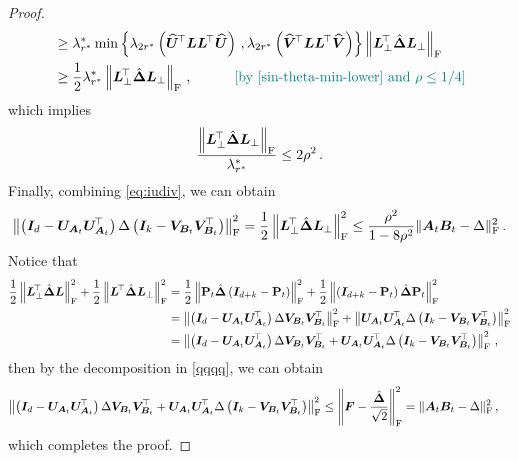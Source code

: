 \begin{proof}
\begin{align*}
    & \geq \lambda^*_{r^*} \min\left\{\lambda_{2r^*}\left(\widehat{\bm U}^{\!\top}\bm L \bm L^{\!\top} \widehat{\bm U}\right)\,,\lambda_{2r^*}\left(\widehat{\bm V}^{\!\top}\bm L \bm L^{\!\top} \widehat{\bm V}\right)\right\}\left\|\bm L_\perp^{\!\top}\hat{\bm \Delta}\bm L_\perp\right\|_{\rm F}\\
    & \geq \frac{1}{2}\lambda^*_{r^*} \left\|\bm L_\perp^{\!\top}\hat{\bm \Delta}\bm L_\perp\right\|_{\rm F}\,, \quad \tag*{\color{teal}[by \cref{sin-theta-min-lower} and $\rho \leq 1/4$]}
\end{align*}
which implies
\begin{align*}
    \frac{\left\|\bm L_\perp^{\!\top}\hat{\bm \Delta}\bm L_\perp\right\|_{\rm F}}{\lambda^*_{r^*}}\leq 2\rho^2\,.
\end{align*}
Finally, combining \cref{eq:iudiv}, we can obtain
\begin{align*}
    \left\|\left(\bm I_d - \bm U_{\bm A_t} \bm U_{\bm A_t}^{\!\top}\right)\Delta\left(\bm I_k - \bm V_{\bm B_t} \bm V_{\bm B_t}^{\!\top}\right)\right\|^2_{\rm F} = \frac{1}{2}\left\|\bm L_\perp^{\!\top}\hat{\bm \Delta}\bm L_\perp\right\|^2_{\rm F} \leq \frac{\rho^2}{1-8\rho^2}\|\bm A_t \bm B_t - \Delta\|^2_{\rm F}\,.
\end{align*}
Notice that
\begin{align*}
    \frac{1}{2}\left\|\bm L_\perp^{\!\top}\hat{\bm \Delta}\bm L\right\|^2_{\rm F} + \frac{1}{2}\left\|\bm L^{\!\top}\hat{\bm \Delta}\bm L_\perp\right\|^2_{\rm F} & = \frac{1}{2}\left\|\mathbf{P}_t \hat{\bm \Delta} \left(\bm I_{d+k}-\mathbf{P}_t\right)\right\|^2_{\rm F} + \frac{1}{2}\left\|\left(\bm I_{d+k}-\mathbf{P}_t\right)\hat{\bm \Delta}\mathbf{P}_t \right\|^2_{\rm F}\\
    & = \left\|\left(\bm I_d - \bm U_{\bm A_t} \bm U_{\bm A_t}^{\!\top}\right)\Delta\bm V_{\bm B_t} \bm V_{\bm B_t}^{\!\top}\right\|^2_{\rm F}+
    \left\|\bm U_{\bm A_t} \bm U_{\bm A_t}^{\!\top}\Delta\left(\bm I_k - \bm V_{\bm B_t} \bm V_{\bm B_t}^{\!\top}\right)\right\|^2_{\rm F}\\
    & = \left\|\left(\bm I_d - \bm U_{\bm A_t} \bm U_{\bm A_t}^{\!\top}\right)\Delta\bm V_{\bm B_t} \bm V_{\bm B_t}^{\!\top}+\bm U_{\bm A_t} \bm U_{\bm A_t}^{\!\top}\Delta\left(\bm I_k - \bm V_{\bm B_t} \bm V_{\bm B_t}^{\!\top}\right)\right\|^2_{\rm F}\,,
\end{align*}
then by the decomposition in \cref{qqqq}, we can obtain
\begin{align*}
    \left\|\left(\bm I_d - \bm U_{\bm A_t} \bm U_{\bm A_t}^{\!\top}\right)\Delta\bm V_{\bm B_t} \bm V_{\bm B_t}^{\!\top}+\bm U_{\bm A_t} \bm U_{\bm A_t}^{\!\top}\Delta\left(\bm I_k - \bm V_{\bm B_t} \bm V_{\bm B_t}^{\!\top}\right)\right\|^2_{\rm F} & \leq \left\|\bm F - \frac{\hat{\bm \Delta}}{\sqrt{2}}\right\|^2_{\rm F} = \|\bm A_t \bm B_t - \Delta\|^2_{\rm F}\,,
\end{align*}
which completes the proof.
\end{proof}


